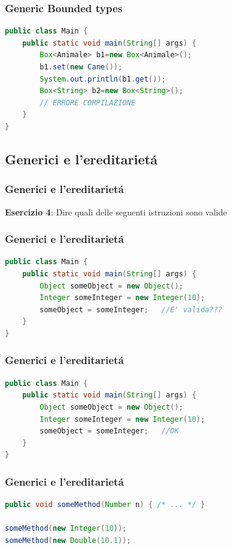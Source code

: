 \documentclass{beamer}
\begin{document}
\begin{frame}[fragile]
\frametitle{Generic Bounded types}
\begin{framed}
\begin{lstlisting}[language=Java]
public class Main {
    public static void main(String[] args) {
        Box<Animale> b1=new Box<Animale>();
        b1.set(new Cane());
        System.out.println(b1.get());
        Box<String> b2=new Box<String>(); 
        // ERRORE COMPILAZIONE
    }
}
\end{lstlisting}
\end{framed}
\end{frame}

\subsection{Generici e l'ereditariet\'a}
\begin{frame}[fragile]
\frametitle{Generici e l'ereditariet\'a}
\begin{framed}
\textbf{Esercizio 4}: Dire quali delle seguenti istruzioni sono valide
\end{framed}
\end{frame}

\begin{frame}[fragile]
\frametitle{Generici e l'ereditariet\'a}
\begin{framed}
\begin{lstlisting}[language=Java]
public class Main {
    public static void main(String[] args) {
        Object someObject = new Object();
        Integer someInteger = new Integer(10);
        someObject = someInteger;   //E' valida???
    }
}
\end{lstlisting}
\end{framed}
\end{frame}

\begin{frame}[fragile]
\frametitle{Generici e l'ereditariet\'a}
\begin{framed}
\begin{lstlisting}[language=Java]
public class Main {
    public static void main(String[] args) {
        Object someObject = new Object();
        Integer someInteger = new Integer(10);
        someObject = someInteger;   //OK
    }
}
\end{lstlisting}
\end{framed}
\end{frame}

\begin{frame}[fragile]
\frametitle{Generici e l'ereditariet\'a}
\begin{framed}
\begin{lstlisting}[language=Java]
public void someMethod(Number n) { /* ... */ }

someMethod(new Integer(10));   
someMethod(new Double(10.1));  
\end{lstlisting}
\end{framed}
\end{frame}
\end{document}
